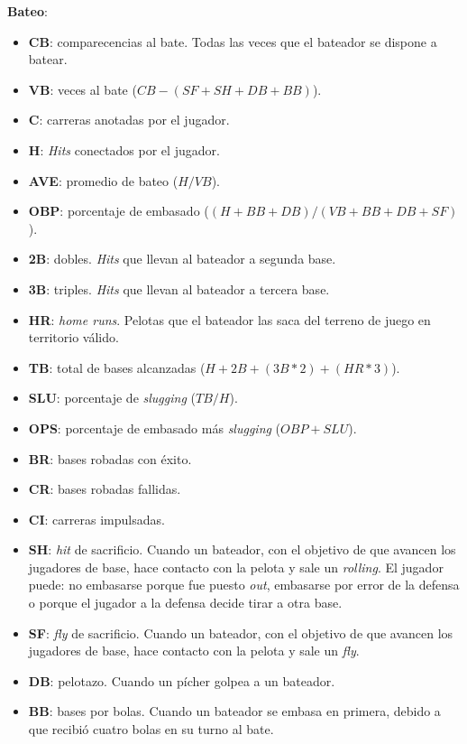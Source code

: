 \large{\textbf{Bateo}:}
\normalsize
\begin{itemize}
	\item \textbf{CB}: comparecencias al bate. Todas las veces que el bateador se dispone a batear.
	\item \textbf{VB}: veces al bate ($ CB - (SF + SH + DB + BB)$).
	\item \textbf{C}: carreras anotadas por el jugador.
	\item \textbf{H}: \textit{Hits} conectados por el jugador.
	\item \textbf{AVE}: promedio de bateo ($ H/VB $).
	\item \textbf{OBP}: porcentaje de embasado ($(H + BB + DB) / (VB + BB + DB + SF)$).
	\item \textbf{2B}: dobles. \textit{Hits} que llevan al bateador a segunda base.
	\item \textbf{3B}: triples. \textit{Hits} que llevan al bateador a tercera base.
	\item \textbf{HR}: \textit{home runs}. Pelotas que el bateador las saca del terreno de juego en territorio válido.
	\item \textbf{TB}: total de bases alcanzadas ($H+2B+(3B*2)+(HR*3)$).
	\item \textbf{SLU}: porcentaje de \textit{slugging} ($ TB / H $).
	\item \textbf{OPS}: porcentaje de embasado más \textit{slugging} ($ OBP + SLU $).
	\item \textbf{BR}: bases robadas con éxito.
	\item \textbf{CR}: bases robadas fallidas.
	\item \textbf{CI}: carreras impulsadas.
	\item \textbf{SH}: \textit{hit} de sacrificio. Cuando un bateador, con el objetivo de que avancen los jugadores de base, hace contacto con la pelota y sale un \textit{rolling}. El jugador puede: no embasarse porque fue puesto \textit{out}, embasarse por error de la defensa o porque el jugador a la defensa decide tirar a otra base.
	\item \textbf{SF}: \textit{fly} de sacrificio. Cuando un bateador, con el objetivo de que avancen los jugadores de base, hace contacto con la pelota y sale un \textit{fly}.
	\item \textbf{DB}: pelotazo. Cuando un pícher golpea a un bateador.
	\item \textbf{BB}: bases por bolas. Cuando un bateador se embasa en primera, debido a que recibió cuatro bolas en su turno al bate.

\end{itemize}
